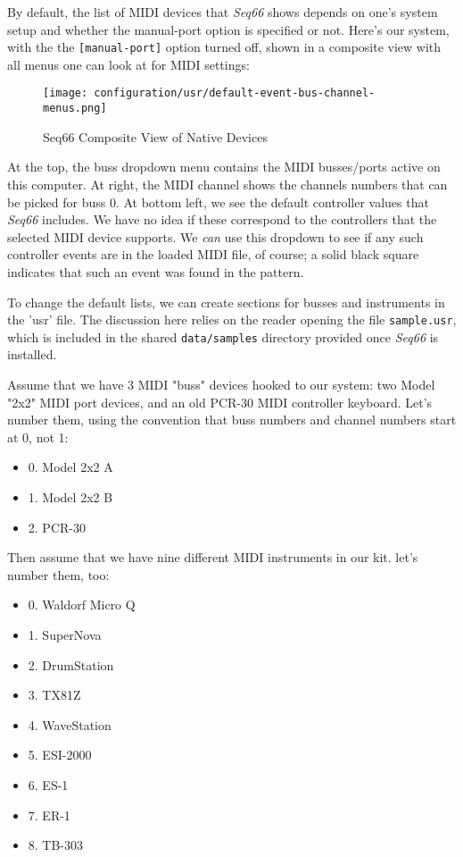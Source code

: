    By default, the list of MIDI devices that \textsl{Seq66} shows depends
   on one's system setup and whether the manual-port option is specified
   or not.  Here's our system, with the
   the \texttt{[manual-port]} option turned off, shown in a
   composite view with all menus one can look at for MIDI settings:

\begin{figure}[H]
   \centering 
   \texttt{[image: configuration/usr/default-event-bus-channel-menus.png]}
   \caption{Seq66 Composite View of Native Devices}
   \label{fig:default_event_bus_channel_menus}
\end{figure}

   At the top, the buss dropdown menu contains the MIDI busses/ports
   active on this computer.  At right, the MIDI channel shows
   the channels numbers that can be picked for buss 0.  At bottom left, we see
   the default controller values that \textsl{Seq66} includes.  We have
   no idea if these correspond to the controllers that the selected MIDI device
   supports.  We \textsl{can} use this dropdown to see if any such controller
   events are in the loaded MIDI file, of course; a solid black square
   indicates that such an event was found in the pattern.

   To change the default lists, we can create sections for busses and
   instruments in the 'usr' file.
   The discussion here relies on the reader opening the file
   \texttt{sample.usr}, which is included in the shared \texttt{data/samples}
   directory provided once \textsl{Seq66} is installed.

   Assume that we have 3 MIDI "buss" devices hooked to our system:
   two Model "2x2" MIDI port devices, and an old PCR-30 MIDI controller
   keyboard.  Let's number them, using the convention that buss numbers and
   channel numbers start at 0, not 1:

   \begin{itemize}
      \item 0. Model 2x2 A
      \item 1. Model 2x2 B
      \item 2. PCR-30
   \end{itemize}

   Then assume that we have nine different MIDI instruments in our kit.
   let's number them, too:

   \begin{itemize}
      \item 0. Waldorf Micro Q
      \item 1. SuperNova
      \item 2. DrumStation
      \item 3. TX81Z
      \item 4. WaveStation
      \item 5. ESI-2000
      \item 6. ES-1
      \item 7. ER-1
      \item 8. TB-303
   \end{itemize}

